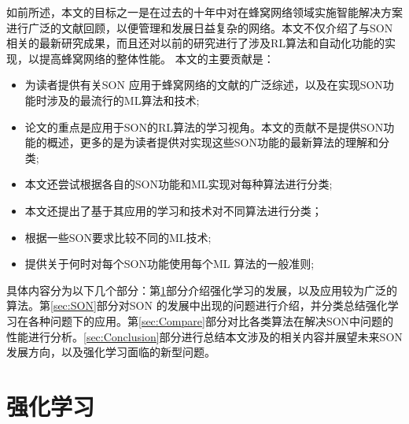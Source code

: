 \documentclass{IEEEtran}
\begin{document}
如前所述，本文的目标之一是在过去的十年中对在蜂窝网络领域实施智能解决方案进行广泛的文献回顾，以便管理和发展日益复杂的网络。本文不仅介绍了与SON相关的最新研究成果，而且还对以前的研究进行了涉及RL算法和自动化功能的实现，以提高蜂窝网络的整体性能。
本文的主要贡献是：
\begin{itemize}
  \item 为读者提供有关SON 应用于蜂窝网络的文献的广泛综述，以及在实现SON功能时涉及的最流行的ML算法和技术;
  \item 论文的重点是应用于SON的RL算法的学习视角。本文的贡献不是提供SON功能的概述，更多的是为读者提供对实现这些SON功能的最新算法的理解和分类;
  \item 本文还尝试根据各自的SON功能和ML实现对每种算法进行分类;
  \item 本文还提出了基于其应用的学习和技术对不同算法进行分类；
  \item 根据一些SON要求比较不同的ML技术;
  \item 提供关于何时对每个SON功能使用每个ML 算法的一般准则;
\end{itemize}

具体内容分为以下几个部分：第\ref{sec:RL}部分介绍强化学习的发展，以及应用较为广泛的算法。第\ref{sec:SON}部分对SON 的发展中出现的问题进行介绍，并分类总结强化学习在各种问题下的应用。第\ref{sec:Compare}部分对比各类算法在解决SON中问题的性能进行分析。\ref{sec:Conclusion}部分进行总结本文涉及的相关内容并展望未来SON发展方向，以及强化学习面临的新型问题。
\section{强化学习}
\label{sec:RL}
\end{document}
